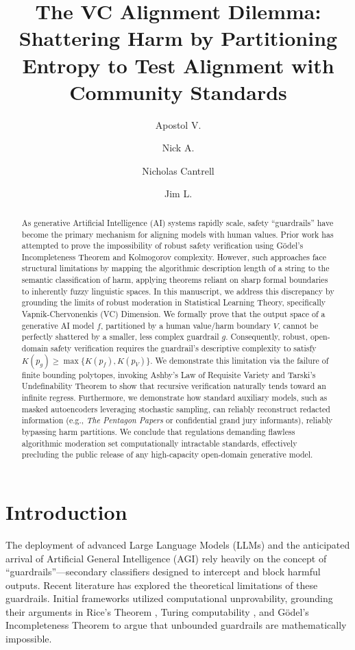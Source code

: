 \documentclass[11pt,twoside,letterpaper]{article}
\title{\bf \Large The VC Alignment Dilemma:\\Shattering Harm by Partitioning Entropy  to Test Alignment with Community Standards}
\author[1]{Apostol V.}
\author[2]{Nick A.}
\author[3]{Nicholas Cantrell}
\author[4]{Jim L.}
\affil[1]{\small Affiliation 1}
\affil[2]{\small Affiliation 2}
\affil[3]{\small CyberGolem ASI Research Lab}
\affil[4]{\small Affiliation 4}
\date{\vspace{-5ex}} %
\begin{document}
\maketitle

\begin{abstract}
As generative Artificial Intelligence (AI) systems rapidly scale, safety ``guardrails'' have become the primary mechanism for aligning models with human values. Prior work has attempted to prove the impossibility of robust safety verification using Gödel's Incompleteness Theorem and Kolmogorov complexity. 
However, such approaches face structural limitations by mapping the algorithmic description length of a string to the semantic classification of harm, applying theorems reliant on sharp formal boundaries to inherently fuzzy linguistic spaces. 
In this manuscript, we address this discrepancy by grounding the limits of robust moderation in Statistical Learning Theory, specifically Vapnik-Chervonenkis (VC) Dimension. 
We formally prove that the output space of a generative AI model $f$, partitioned by a human value/harm boundary $V$, cannot be perfectly shattered by a smaller, less complex guardrail $g$. Consequently, robust, open-domain safety verification requires the guardrail's descriptive complexity to satisfy $K(p_g) \geq \max\{K(p_f), K(p_V)\}$. 
We demonstrate this limitation via the failure of finite bounding polytopes, invoking Ashby's Law of Requisite Variety and Tarski's Undefinability Theorem to show that recursive verification naturally tends toward an infinite regress. 
Furthermore, we demonstrate how standard auxiliary models, such as masked autoencoders leveraging stochastic sampling, can reliably reconstruct redacted information (e.g., \textit{The Pentagon Papers} or confidential grand jury informants), reliably bypassing harm partitions. 
We conclude that regulations demanding flawless algorithmic moderation set computationally intractable standards, effectively precluding the public release of any high-capacity open-domain generative model.
\end{abstract}

\section{Introduction}

The deployment of advanced Large Language Models (LLMs) and the anticipated arrival of Artificial General Intelligence (AGI) rely heavily on the concept of ``guardrails''—secondary classifiers designed to intercept and block harmful outputs. Recent literature has explored the theoretical limitations of these guardrails. Initial frameworks \cite{cybergolem2025, vassilev2025} utilized computational unprovability, grounding their arguments in Rice's Theorem \cite{rice1953classes}, Turing computability \cite{turing1936}, and Gödel's Incompleteness Theorem \cite{godel1931} to argue that unbounded guardrails are mathematically impossible. 
\end{document}

